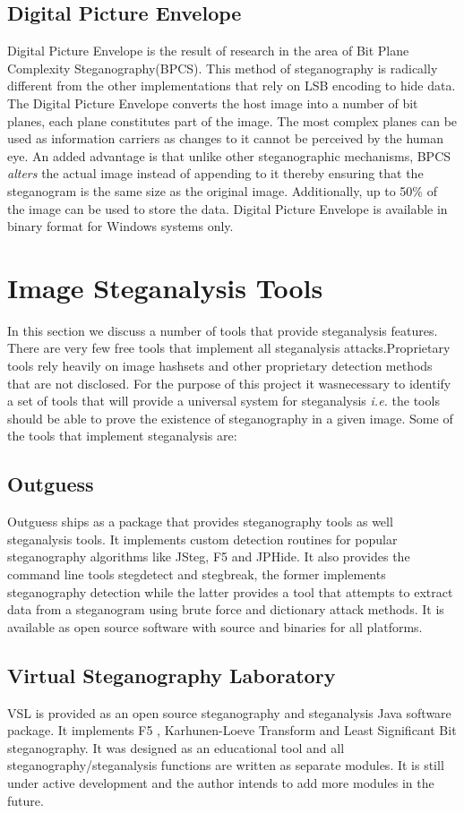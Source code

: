  \subsection{Digital Picture Envelope}
 Digital Picture Envelope is the result of research \cite{kawaguchi1998concept} in the area of Bit Plane Complexity Steganography(BPCS). This method of steganography is radically different from the other implementations that rely on LSB encoding to hide data. The Digital Picture Envelope converts the host image into a number of bit planes, each plane constitutes part of the image. The most complex planes can be used as information carriers as changes to it cannot be perceived by the human eye.  An added advantage is that unlike other steganographic mechanisms, BPCS \emph{alters} the actual image instead of appending to it thereby ensuring that the steganogram is the same size as the original image. Additionally, up to 50\% of the image can be used to store the data. Digital Picture Envelope is available in binary format for Windows systems only. 
 
\section{Image Steganalysis Tools}
\label{sec:steganalysistools}
In this section we discuss a number of tools that provide steganalysis features. There are very few free tools that implement all steganalysis attacks.Proprietary tools rely heavily on image hashsets and other proprietary detection methods that are not disclosed. For the purpose of this project it wasnecessary to identify a set of tools that will provide a universal system for steganalysis \emph{i.e.} the tools should be able to prove the existence of steganography in a given image. Some of the tools that implement steganalysis are:
\subsection{Outguess}  Outguess \cite{outguess} ships as a package that provides steganography tools as well steganalysis tools. It implements custom detection routines for popular steganography algorithms like JSteg, F5 and JPHide. It also provides the command line tools stegdetect and stegbreak, the former implements steganography detection while the latter provides a tool that attempts to extract data from a steganogram using brute force and dictionary attack methods. It is available as open source software with source and binaries for all platforms. 
\subsection{Virtual Steganography Laboratory} VSL \cite{wegrzyn2009} is provided as an open source steganography and steganalysis Java software package. It implements F5 \cite{westfeld2001f5}, Karhunen-Loeve Transform \cite{stanescu2007digital} and Least Significant Bit steganography. It was designed as an educational tool and all steganography/steganalysis functions are written as separate modules. It is still under active development and the author intends to add more modules in the future.

